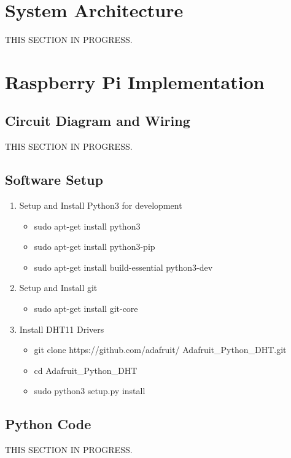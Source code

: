 \documentclass{article}
\begin{document}
\begin{multicols}{2}
		\section{System Architecture}
		THIS SECTION IN PROGRESS.
		
		\section{Raspberry Pi Implementation}
		
			\subsection{Circuit Diagram and Wiring}
			THIS SECTION IN PROGRESS.
			
			\subsection{Software Setup}
			
			\begin{enumerate}
				\item Setup and Install Python3 for development
				\begin{itemize}
					\item sudo apt-get install python3
					\item sudo apt-get install python3-pip
					\item sudo apt-get install build-essential python3-dev
				\end{itemize}
				\item Setup and Install git
				\begin{itemize}
					\item sudo apt-get install git-core
				\end{itemize}
				\item Install DHT11 Drivers
				\begin{itemize}
					\item git clone https://github.com/adafruit/ Adafruit\_Python\_DHT.git
					\item cd Adafruit\_Python\_DHT
					\item sudo python3 setup.py install
				\end{itemize}
			\end{enumerate}
			
			\subsection{Python Code}
			THIS SECTION IN PROGRESS.
			

\end{multicols}
\end{document}
